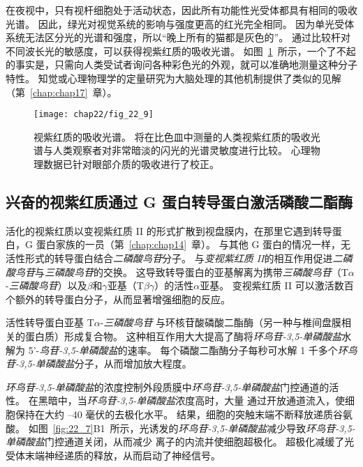 在夜视中，只有视杆细胞处于活动状态，因此所有功能性光受体都具有相同的吸收光谱。
因此，绿光对视觉系统的影响与强度更高的红光完全相同。
因为单光受体系统无法区分光的光谱和强度，所以“晚上所有的猫都是灰色的”。
通过比较杆对不同波长光的敏感度，可以获得视紫红质的吸收光谱。
如图~\ref{fig:22_9}~所示，一个了不起的事实是，只需向人类受试者询问各种彩色光的外观，就可以准确地测量这种分子特性。
知觉或心理物理学的定量研究为大脑处理的其他机制提供了类似的见解（第~\ref{chap:chap17}~章）。


\begin{figure}[htbp]
	\centering
	\texttt{[image: chap22/fig\_22\_9]}
	\caption{视紫红质的吸收光谱。 
		将在比色皿中测量的人类视紫红质的吸收光谱与人类观察者对非常暗淡的闪光的光谱灵敏度进行比较。
		心理物理数据已针对眼部介质的吸收进行了校正。}
	\label{fig:22_9}
\end{figure}



\subsection{兴奋的视紫红质通过 G 蛋白转导蛋白激活磷酸二酯酶}

活化的视紫红质以变视紫红质 II 的形式扩散到视盘膜内，在那里它遇到转导蛋白，G 蛋白家族的一员（第~\ref{chap:chap14}~章）。
与其他 G 蛋白的情况一样，无活性形式的转导蛋白结合\textit{二磷酸鸟苷}分子。
与\textit{变视紫红质 II}的相互作用促进\textit{二磷酸鸟苷}与\textit{三磷酸鸟苷}的交换。
这导致转导蛋白的亚基解离为携带\textit{三磷酸鸟苷}（T$\alpha$-\textit{三磷酸鸟苷}）以及$\beta$和$\gamma$亚基（T$\beta$$\gamma$）的活性$\alpha$亚基。
变视紫红质 II 可以激活数百个额外的转导蛋白分子，从而显著增强细胞的反应。


活性转导蛋白亚基 T$\alpha$-\textit{三磷酸鸟苷} 与环核苷酸磷酸二酯酶（另一种与椎间盘膜相关的蛋白质）形成复合物。
这种相互作用大大提高了酶将\textit{环鸟苷-3,5-单磷酸盐}水解为 5'-\textit{鸟苷-3,5-单磷酸盐}的速率。
每个磷酸二酯酶分子每秒可水解 1 千多个\textit{环鸟苷-3,5-单磷酸盐}分子，从而增加放大程度。


\textit{环鸟苷-3,5-单磷酸盐}的浓度控制外段质膜中\textit{环鸟苷-3,5-单磷酸盐}门控通道的活性。
在黑暗中，当\textit{环鸟苷-3,5-单磷酸盐}浓度高时，大量  通过开放通道流入，使细胞保持在大约 –40 毫伏的去极化水平。
结果，细胞的突触末端不断释放递质谷氨酸。
如图~\ref{fig:22_7}B1~所示，光诱发的\textit{环鸟苷-3,5-单磷酸盐}减少导致\textit{环鸟苷-3,5-单磷酸盐}门控通道关闭，从而减少  离子的内流并使细胞超极化。
超极化减缓了光受体末端神经递质的释放，从而启动了神经信号。



